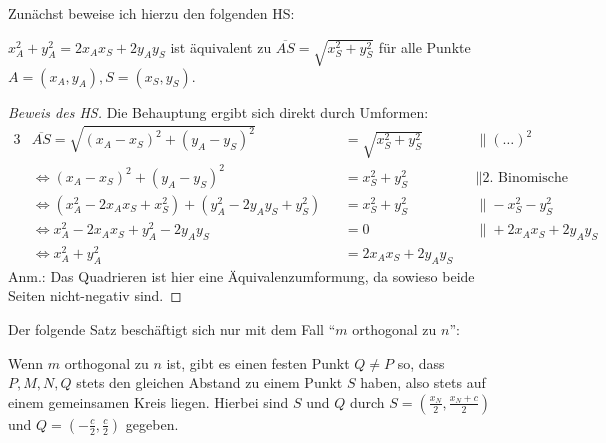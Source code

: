 Zunächst beweise ich hierzu den folgenden HS:
\begin{lem}\label{cor_hilfe}
    $x_A^2+y_A^2=2x_Ax_S+2y_Ay_S$ ist äquivalent zu $\overline{AS}=\sqrt{x_S^2+y_S^2}$ für alle 
    Punkte $A=(x_A, y_A), S=(x_S, y_S)$.
\end{lem}
\begin{proof}[Beweis des HS]
    \renewcommand{\qedsymbol}{$\square$}
    Die Behauptung ergibt sich direkt durch Umformen:
    \begin{alignat*}{3}
        &\overline{AS}=\sqrt{(x_A-x_S)^2+(y_A-y_S)^2}&&=\sqrt{x_S^2+y_S^2}\quad&&\|(\ldots)^2\\
        &\Leftrightarrow (x_A-x_S)^2+(y_A-y_S)^2&&=x_S^2+y_S^2\quad &&\|\text{2. Binomische Formel}\\
        &\Leftrightarrow (x_A^2-2x_Ax_S+x_S^2)+(y_A^2-2y_Ay_S+y_S^2)&&=x_S^2+y_S^2\quad &&\|-x_S^2-y_S^2\\
        &\Leftrightarrow x_A^2-2x_Ax_S+y_A^2-2y_Ay_S&&=0\quad &&\|+2x_Ax_S+2y_Ay_S\\
        &\Leftrightarrow x_A^2+y_A^2&&=2x_Ax_S+2y_Ay_S&&
    \end{alignat*}
    Anm.: Das Quadrieren ist hier eine Äquivalenzumformung, da sowieso beide Seiten nicht-negativ sind.
\end{proof}
Der folgende Satz beschäftigt sich nur mit dem Fall "`$m$ orthogonal zu $n$"':
\begin{thm}\label{aufgabe_3}
    Wenn $m$ orthogonal zu $n$ ist, gibt es einen festen Punkt $Q\neq P$ so, dass $P, M, N, Q$ stets 
    den gleichen Abstand zu einem Punkt $S$ haben, also stets auf einem gemeinsamen Kreis liegen. 
    Hierbei sind $S$ und $Q$ durch $S=\left(\frac{x_N}{2}, \frac{x_N+c}{2}\right)$ und $Q=\left(-\frac{c}{2}, 
    \frac{c}{2}\right)$ gegeben.
\end{thm}
